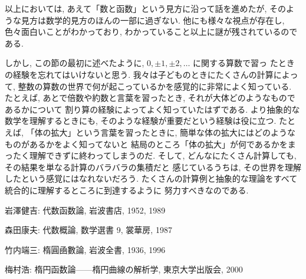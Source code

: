 \documentclass[12pt,twoside]{jarticle}
\begin{document}
以上においては, あえて「数と函数」という見方に沿って話を進めたが, 
そのような見方は数学的見方のほんの一部に過ぎない.
他にも様々な視点が存在し, 色々面白いことがわかっており,
わかっていること以上に謎が残されているのである.

しかし, この節の最初に述べたように, $0,\pm1,\pm2,\ldots$ に関する算数で習っ
たときの経験を忘れてはいけないと思う.  
我々は子どものときにたくさんの計算によって, 
整数の算数の世界で何が起こっているかを感覚的に非常によく知っている.
たとえば, あとで倍数や約数と言葉を習ったとき, 
それが大体どのようなものであるかについて
割り算の経験によってよく知っていたはずである.
より抽象的な数学を理解するときにも, 
そのような経験が重要だという経験は役に立つ.
たとえば, 「体の拡大」という言葉を習ったときに,
簡単な体の拡大にはどのようなものがあるかをよく知ってないと
結局のところ「体の拡大」が何であるかをまったく理解できずに終わってしまうのだ.
そして, どんなにたくさん計算しても, その結果を単なる計算のバラバラの集積だと
感じているうちは, その世界を理解したという感覚にはなれないだろう.
たくさんの計算例と抽象的な理論をすべて統合的に理解するところに到達するように
努力すべきなのである.

\bigskip\bigskip{}


\begin{thebibliography}{AB}



岩澤健吉: 代数函数論, 岩波書店, 1952, 1989


森田康夫: 代数概論, 数学選書 9, 裳華房, 1987






竹内端三: 楕圓凾數論, 岩波全書, 1936, 1996


梅村浩: 楕円函数論——楕円曲線の解析学, 東京大学出版会, 2000

\end{thebibliography}

\end{document}

